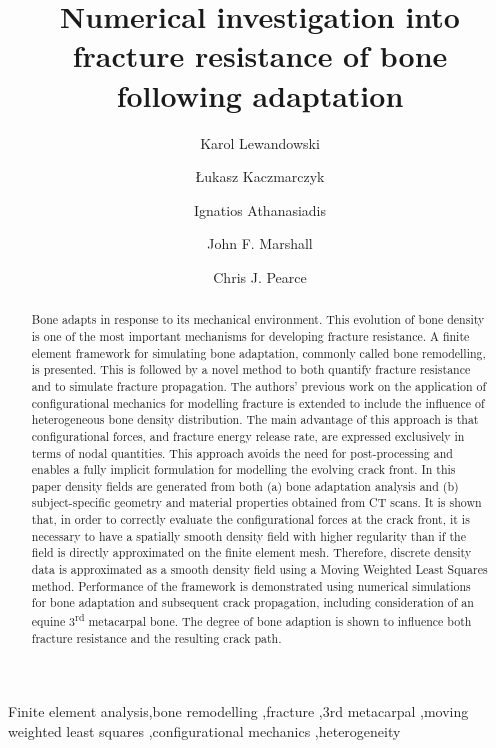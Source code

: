 \documentclass[review]{elsarticle}
\numberwithin{equation}{section}
\begin{document}

\begin{frontmatter}

\title{Numerical investigation into fracture resistance of bone following adaptation}

\author[gla,vet]{Karol Lewandowski}
\author[gla]{{\L}ukasz Kaczmarczyk}
\author[gla]{Ignatios Athanasiadis}
\author[vet]{John F. Marshall}
\author[gla]{Chris J. Pearce}
\address[gla]{Glasgow Computational Engineering Centre, The James Watt School of Engineering, University of Glasgow, Glasgow, G12 8QQ, UK.}
\address[vet]{Weipers Centre Equine Hospital, School of Veterinary Medicine, University of Glasgow, Glasgow, G61 1QH, UK,}

\begin{abstract}
Bone adapts in response to its mechanical environment. 
This evolution of bone density is one of the most important mechanisms for developing fracture resistance. 
A finite element framework for simulating bone adaptation, commonly called bone remodelling, is presented. This is followed by a novel method to both quantify fracture resistance and to simulate fracture propagation. The authors' previous work on the application of configurational mechanics for modelling fracture is extended to include the influence of heterogeneous bone density distribution. The main advantage of this approach is that configurational forces, and fracture energy release rate, are expressed exclusively in terms of nodal quantities. This approach avoids the need for post-processing and enables a fully implicit formulation for modelling the evolving crack front.
In this paper density fields are generated from both (a) bone adaptation analysis and (b) subject-specific geometry and material properties obtained from CT scans. It is shown that, in order to correctly evaluate the configurational forces at the crack front, it is necessary to have a spatially smooth density field with higher regularity than if the field is directly approximated on the finite element mesh. Therefore, discrete density data is approximated as a smooth density field using a Moving Weighted Least Squares method.
Performance of the framework is demonstrated using numerical simulations for bone adaptation and subsequent crack propagation, including consideration of an equine 3\textsuperscript{rd} metacarpal bone. The degree of bone adaption is shown to influence both fracture resistance and the resulting crack path. 

\end{abstract}

\begin{keyword}	
Finite element analysis\sep bone remodelling \sep fracture \sep 3rd metacarpal \sep moving weighted least squares \sep configurational mechanics \sep heterogeneity
\end{keyword}
%
\end{frontmatter}
\end{document}
